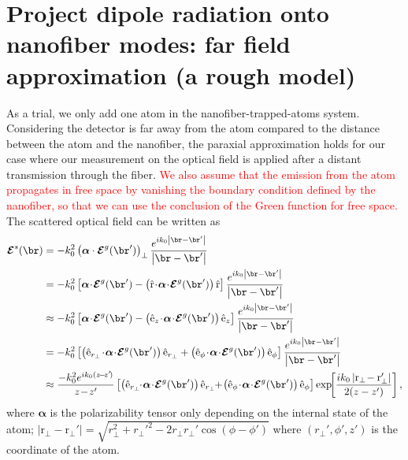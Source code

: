\chapter{Project dipole radiation onto nanofiber modes: far field approximation (a rough model)}\label{ch:FreeDipoleProjection}
As a trial, we only add one atom in the nanofiber-trapped-atoms system. 
Considering the detector is far away from the atom compared to the distance between the atom and the nanofiber, the paraxial approximation holds for our case where our measurement on the optical field is applied after a distant transmission through the fiber. \textcolor{red}{We also assume that the emission from the atom propagates in free space by vanishing the boundary condition defined by the nanofiber, so that we can use the conclusion of the Green function for free space. }
The scattered optical field can be written as 
\begin{align}
\boldsymbol{\mathcal{E}}^s(\br) &=-k_0^2\left(\boldsymbol{\alpha}\cdot \boldsymbol{\mathcal{E}}^g(\br')\right)_\perp \frac{e^{ik_0 \left| \br-\br' \right| }}{\left| \br-\br'\right| }\\
&=-k_0^2\left[ \boldsymbol{\alpha}\!\cdot\! \boldsymbol{\mathcal{E}}^g(\br') - \left(\hat{\mathrm{r}}\! \cdot\! \boldsymbol{\alpha}\!\cdot\! \boldsymbol{\mathcal{E}}^g(\br') \right) \hat{\mathrm{r}}\right] \frac{e^{ik_0 \left| \br-\br' \right| }}{\left| \br-\br'\right| }\\
&\approx -k_0^2\left[ \boldsymbol{\alpha}\!\cdot\! \boldsymbol{\mathcal{E}}^g(\br') - \left(\hat{\mathrm{e}}_z\! \cdot\! \boldsymbol{\alpha}\!\cdot\! \boldsymbol{\mathcal{E}}^g(\br') \right) \hat{\mathrm{e}}_z\right] \frac{e^{ik_0 \left| \br-\br' \right| }}{\left| \br-\br'\right| }\\
&=-k_0^2 \left[\left(\hat{\mathrm{e}}_{r_\perp} \! \cdot \! \boldsymbol{\alpha} \! \cdot\! \boldsymbol{\mathcal{E}}^g(\br')\right)\hat{\mathrm{e}}_{r_\perp} + \left(\hat{\mathrm{e}}_\phi \! \cdot \! \boldsymbol{\alpha} \! \cdot \! \boldsymbol{\mathcal{E}}^g(\br') \right)\hat{\mathrm{e}}_\phi \right] 
\frac{e^{ik_0 \left| \br-\br' \right| }}{\left| \br-\br'\right| }\\
&\approx \frac{-k_0^2 e^{ik_0(z\!-\!z'\!)}}{z\!-\!z'}\left[\left(\hat{\mathrm{e}}_{r_\perp} \!\!\cdot\! \boldsymbol{\alpha}\!\cdot\! \boldsymbol{\mathcal{E}}^g(\br')\right)\hat{\mathrm{e}}_{r_\perp} \!\! +\! \left(\hat{\mathrm{e}}_\phi\!\cdot\! \boldsymbol{\alpha}\!\cdot\! \boldsymbol{\mathcal{E}}^g(\br') \right)\hat{\mathrm{e}}_\phi \right] \exp\!\! \left[ \frac{ik_0 \left| \mathrm{r}_\perp\! - \mathrm{r}_\perp'\right|}{2(z-z')}  \right],\label{Erscatt}
\end{align}
where $ \boldsymbol{\alpha} $ is the polarizability tensor only depending on the internal state of the atom; $ \left| \mathrm{r}_\perp - \mathrm{r}_\perp'\right|=\sqrt{r_\perp^2+{r_\perp'}^2 - 2 r_\perp r_\perp'\cos(\phi-\phi')} $ where $ (r_\perp',\phi',z') $ is the coordinate of the atom. 

